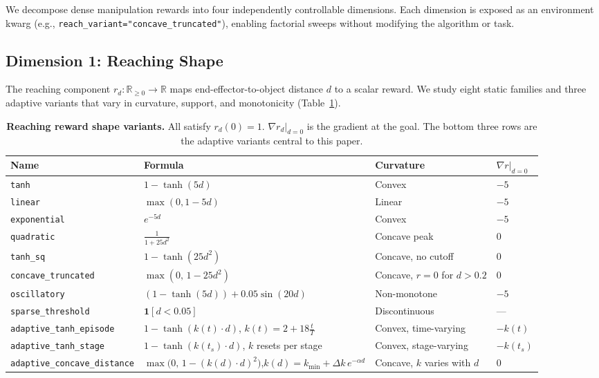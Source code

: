 \documentclass{article}
\begin{document}
We decompose dense manipulation rewards into four independently controllable dimensions.
Each dimension is exposed as an environment kwarg (e.g.,
\texttt{reach\_variant="concave\_truncated"}), enabling factorial sweeps without
modifying the algorithm or task.

\subsection{Dimension 1: Reaching Shape}

The reaching component $r_d : \mathbb{R}_{\geq 0} \to \mathbb{R}$ maps
end-effector-to-object distance $d$ to a scalar reward. We study eight static families
and three adaptive variants that vary in curvature, support, and monotonicity
(Table~\ref{tab:reach}).

\begin{table}[h]
\centering
\small
\caption{\textbf{Reaching reward shape variants.} All satisfy $r_d(0) = 1$.
$\nabla r_d|_{d=0}$ is the gradient at the goal. The bottom three rows are the
adaptive variants central to this paper.}
\label{tab:reach}
\begin{tabular}{@{}llll@{}}
\toprule
\textbf{Name} & \textbf{Formula} & \textbf{Curvature} & \textbf{$\nabla r|_{d=0}$} \\
\midrule
\texttt{tanh}              & $1 - \tanh(5d)$               & Convex & $-5$ \\
\texttt{linear}            & $\max(0, 1 - 5d)$             & Linear & $-5$ \\
\texttt{exponential}       & $e^{-5d}$                     & Convex & $-5$ \\
\texttt{quadratic}         & $\frac{1}{1+25d^2}$           & Concave peak & $0$ \\
\texttt{tanh\_sq}          & $1 - \tanh(25d^2)$            & Concave, no cutoff & $0$ \\
\texttt{concave\_truncated}& $\max(0,\, 1 - 25d^2)$        & Concave, $r=0$ for $d>0.2$ & $0$ \\
\texttt{oscillatory}       & $(1-\tanh(5d)) + 0.05\sin(20d)$ & Non-monotone & $-5$ \\
\texttt{sparse\_threshold} & $\mathbf{1}[d < 0.05]$        & Discontinuous & --- \\
\midrule
\texttt{adaptive\_tanh\_episode} & $1 - \tanh(k(t)\cdot d)$, $k(t)=2{+}18\tfrac{t}{T}$ & Convex, time-varying & $-k(t)$ \\
\texttt{adaptive\_tanh\_stage}   & $1 - \tanh(k(t_s)\cdot d)$, $k$ resets per stage & Convex, stage-varying & $-k(t_s)$ \\
\texttt{adaptive\_concave\_distance} & $\max\!\bigl(0,\,1-(k(d){\cdot}d)^2\bigr)$,\;$k(d)=k_{\min}+\Delta k\,e^{-\alpha d}$ & Concave, $k$ varies with $d$ & $0$ \\
\bottomrule
\end{tabular}
\end{table}
\end{document}
